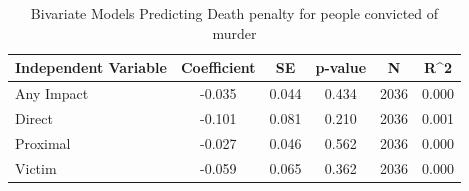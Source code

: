 \begin{table}

\caption{\label{tab:tab:prisonpen_1_bivariate}Bivariate Models Predicting Death penalty for people convicted of murder}
\centering
\begin{tabular}[t]{lccccc}
\toprule
Independent Variable & Coefficient & SE & p-value & N & R\textasciicircum{}2\\
\midrule
Any Impact & -0.035 & 0.044 & 0.434 & 2036 & 0.000\\
Direct & -0.101 & 0.081 & 0.210 & 2036 & 0.001\\
Proximal & -0.027 & 0.046 & 0.562 & 2036 & 0.000\\
Victim & -0.059 & 0.065 & 0.362 & 2036 & 0.000\\
\bottomrule
\end{tabular}
\end{table}
